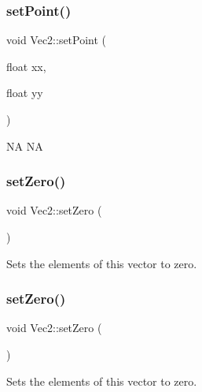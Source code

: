 \subsubsection{\texorpdfstring{set\+Point()}{setPoint()}\hspace{0.1cm}{\footnotesize\ttfamily [2/2]}}
{\footnotesize\ttfamily void Vec2\+::set\+Point (\begin{DoxyParamCaption}\item[{float}]{xx,  }\item[{float}]{yy }\end{DoxyParamCaption})\hspace{0.3cm}{\ttfamily [inline]}}

NA  NA \mbox{\label{classVec2_aa39a7344e5af312b4aa88fdf21aa5369}} 
\subsubsection{\texorpdfstring{set\+Zero()}{setZero()}\hspace{0.1cm}{\footnotesize\ttfamily [1/2]}}
{\footnotesize\ttfamily void Vec2\+::set\+Zero (\begin{DoxyParamCaption}{ }\end{DoxyParamCaption})\hspace{0.3cm}{\ttfamily [inline]}}

Sets the elements of this vector to zero. \mbox{\label{classVec2_aa39a7344e5af312b4aa88fdf21aa5369}} 
\subsubsection{\texorpdfstring{set\+Zero()}{setZero()}\hspace{0.1cm}{\footnotesize\ttfamily [2/2]}}
{\footnotesize\ttfamily void Vec2\+::set\+Zero (\begin{DoxyParamCaption}{ }\end{DoxyParamCaption})\hspace{0.3cm}{\ttfamily [inline]}}

Sets the elements of this vector to zero. \mbox{\label{classVec2_a6e37c8d6604b45cc5206ea64ac2d4c77}} 
